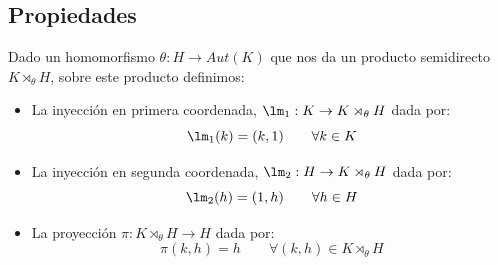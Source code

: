 \subsection{Propiedades}
\begin{definicion}
    Dado un homomorfismo $\theta:H\to Aut(K)$ que nos da un producto semidirecto $K\rtimes_\theta H$, sobre este producto definimos:
    \begin{itemize}
        \item La inyección en primera coordenada, $\lm_1:K\to K\rtimes_\theta H$ dada por:
            \begin{equation*}
                \lm_1(k) = (k,1) \qquad \forall k\in K
            \end{equation*}
        \item La inyección en segunda coordenada, $\lm_2:H\to K\rtimes_\theta H$ dada por:
            \begin{equation*}
                \lm_2(h) = (1,h) \qquad \forall h\in H
            \end{equation*}
        \item La proyección $\pi:K\rtimes_\theta H \to H$ dada por:
            \begin{equation*}
                \pi(k,h) = h \qquad \forall (k,h)\in K\rtimes_\theta H
            \end{equation*}
    \end{itemize}
    \begin{figure}[H]
        \centering
    \end{figure}
\end{definicion}

